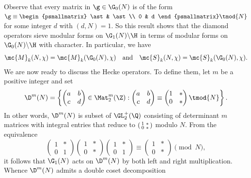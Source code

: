 \documentclass[12pt]{article}
\begin{document}
      Observe that every matrix in \(\g \in \G_{0}(N)\) is of the form \(\g \equiv \begin{psmallmatrix} \ast & \ast \\ 0 & d \end{psmallmatrix} \tmod{N}\) for some integer \(d\) with \((d,N) = 1\). So this result shows that the diamond operators sieve modular forms on \(\G_{1}(N)\backslash\H\) in terms of modular forms on \(\G_{0}(N)\backslash\H\) with character. In particular, we have
      \[
        \mc{M}_{k}(N,\chi) = \mc{M}_{k}(\G_{0}(N),\chi) \quad \text{and} \quad \mc{S}_{k}(N,\chi) = \mc{S}_{k}(\G_{0}(N),\chi).
      \]
      We are now ready to discuss the Hecke operators. To define them, let \(m\) be a positive integer and set
      \[
        \D^{m}(N) = \left\{\begin{pmatrix} a & b \\ c & d \end{pmatrix} \in \Mat_{2}^{m}(\Z): \begin{pmatrix} a & b \\ c & d \end{pmatrix} \equiv \begin{pmatrix} 1 & \ast \\ 0 & \ast \end{pmatrix} \tmod{N} \right\}.
      \]
      In other words, \(\D^{m}(N)\) is subset of \(\GL_{2}^{+}(\Q)\) consisting of determinant \(m\) matrices with integral entries that reduce to \(\begin{psmallmatrix} 1 & \ast \\ 0 & \ast \end{psmallmatrix}\) modulo \(N\). From the equivalence
      \[
        \begin{pmatrix} 1 & \ast \\ 0 & 1 \end{pmatrix}\begin{pmatrix} 1 & \ast \\ 0 & \ast \end{pmatrix}\begin{pmatrix} 1 & \ast \\ 0 & 1 \end{pmatrix} \equiv \begin{pmatrix} 1 & \ast \\ 0 & \ast \end{pmatrix} \pmod{N},
      \]
      it follows that \(\G_{1}(N)\) acts on \(\D^{m}(N)\) by both left and right multiplication. Whence \(\D^{m}(N)\) admits a double coset decomposition
\end{document}
